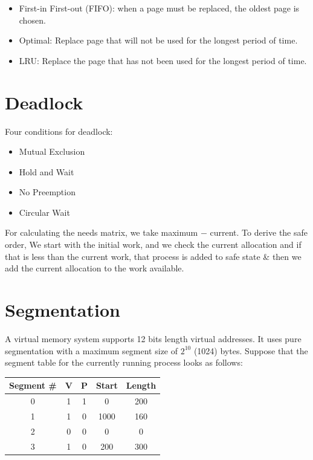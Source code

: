 \documentclass{article}
\begin{document}
\begin{multicols}{2}
    \begin{itemize}
      \item First-in First-out (FIFO): when a page must be replaced, the oldest page is chosen.
      \item Optimal: Replace page that will not be used for the longest period of time.
      \item LRU: Replace the page that has not been used for the longest period of time.
    \end{itemize}

    \section*{Deadlock}

    Four conditions for deadlock:
    \begin{itemize}
      \item Mutual Exclusion
      \item Hold and Wait
      \item No Preemption
      \item Circular Wait
    \end{itemize}

    For calculating the needs matrix, we take maximum $-$ current. To derive the safe order, We
    start with the initial work, and we check the current allocation and if that is less than the
    current work, that process is added to safe state \& then we add the current allocation to the
    work available.

    \section*{Segmentation}

    A virtual memory system supports 12 bits length virtual addresses. It uses pure segmentation
    with a maximum segment size of $2^{10}$ (1024) bytes. Suppose that the segment table for the
    currently running process looks as follows:

    \begin{tabular}{|c|c|c|c|c|}
      \hline
      Segment \# & V & P & Start & Length \\
      \hline
      0 & 1 & 1 & 0 & 200 \\
      \hline
      1 & 1 & 0 & 1000 & 160 \\
      \hline
      2 & 0 & 0 & 0 & 0 \\
      \hline
      3 & 1 & 0 & 200 & 300 \\
      \hline
    \end{tabular}


\end{multicols}
\end{document}
